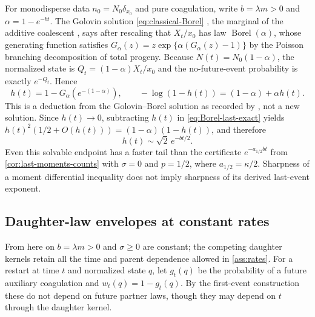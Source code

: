 For monodisperse data $n_0=N_0\delta_{x_0}$ and pure coagulation,
write $b=\lambda m>0$ and $\alpha=1-e^{-bt}$. The Golovin solution
\eqref{eq:classical-Borel} \citep{Golovin1963}, the marginal of the
additive coalescent \citep{AldousPitman1998,Bertoin2002}, says after
rescaling that $X_t/x_0$ has law $\operatorname{Borel}(\alpha)$, whose
generating function satisfies
$G_\alpha(z)=z\exp\{\alpha(G_\alpha(z)-1)\}$ by the Poisson branching
decomposition of total progeny. Because $N(t)=N_0(1-\alpha)$, the
normalized state is $Q_t=(1-\alpha)X_t/x_0$ and the no-future-event
probability is exactly $e^{-Q_t}$. Hence
\begin{equation}
 h(t)=1-G_\alpha(e^{-(1-\alpha)}),\qquad
 -\log(1-h(t))=(1-\alpha)+\alpha h(t).
 \label{eq:Borel-last-exact}
\end{equation}
This is a deduction from the Golovin--Borel solution as recorded by
\citet[equation~(3)]{Bertoin2009}, not a new solution. Since
$h(t)\to0$, subtracting $h(t)$ in \eqref{eq:Borel-last-exact} yields
$h(t)^2(1/2+O(h(t)))=(1-\alpha)(1-h(t))$, and therefore
\begin{equation}
 h(t)\sim\sqrt2\,e^{-bt/2}.
 \label{eq:Borel-last-asymptotic}
\end{equation}
Even this solvable endpoint has a faster tail than the certificate
$e^{-a_{1/2}bt}$ from \cref{cor:last-moments-counts} with $\sigma=0$
and $p=1/2$, where $a_{1/2}=\kappa/2$. Sharpness of a moment
differential inequality does not imply sharpness of its derived
last-event exponent.

\subsection{Daughter-law envelopes at constant rates}
\label{sec:daughter-comparison}

From here on $b=\lambda m>0$ and $\sigma\geq0$ are constant; the
competing daughter kernels retain all the time and parent dependence
allowed in \cref{ass:rates}. For a restart at time $t$ and normalized
state $q$, let $g_t(q)$ be the probability of a future auxiliary
coagulation and $w_t(q)=1-g_t(q)$. By the first-event construction
these do not depend on future partner laws, though they may depend on
$t$ through the daughter kernel.

